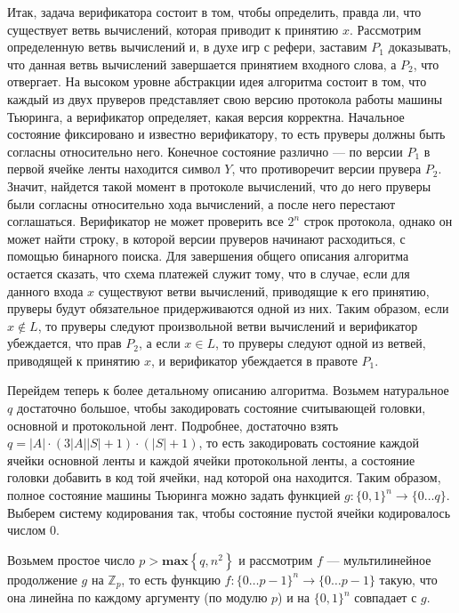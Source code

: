 \documentclass[14pt, a4paper]{extreport}
\newcommand{\set}[1]{\left\{#1\right\}}
\begin{document}
        Итак, задача верификатора состоит в том, чтобы определить, правда ли, что существует ветвь вычислений, которая приводит к принятию $x$. Рассмотрим определенную ветвь вычислений и, в духе игр с рефери, заставим $P_1$ доказывать, что данная ветвь вычислений завершается принятием входного слова, а $P_2$, что отвергает. На высоком уровне абстракции идея алгоритма состоит в том, что каждый из двух пруверов представляет свою версию протокола работы машины Тьюринга, а верификатор определяет, какая версия корректна. Начальное состояние фиксировано и известно верификатору, то есть пруверы должны быть согласны относительно него. Конечное состояние различно --- по версии $P_1$ в первой ячейке ленты находится символ $Y$, что противоречит версии прувера $P_2$. Значит, найдется такой момент в протоколе вычислений, что до него пруверы были согласны относительно хода вычислений, а после него перестают соглашаться.
        Верификатор не может проверить все $2^n$ строк протокола, однако он может найти строку, в которой версии пруверов начинают расходиться, с помощью бинарного поиска. Для завершения общего описания алгоритма остается сказать, что схема платежей служит тому, что в случае, если для данного входа $x$ существуют ветви вычислений, приводящие к его принятию, пруверы будут обязательное придерживаются одной из них. Таким образом, если $x \notin L$, то пруверы следуют произвольной ветви вычислений и верификатор убеждается, что прав $P_2$, а если $x \in L$, то пруверы следуют одной из ветвей, приводящей к принятию $x$, и верификатор убеждается в правоте $P_1$.

        Перейдем теперь к более детальному описанию алгоритма. Возьмем натуральное $q$ достаточно большое, чтобы закодировать состояние считывающей головки, основной и протокольной лент. Подробнее, достаточно взять $q = |A| \cdot (3|A||S| + 1) \cdot (|S| + 1)$, то есть закодировать состояние каждой ячейки основной ленты и каждой ячейки протокольной ленты, а состояние головки добавить в код той ячейки, над которой она находится. Таким образом, полное состояние машины Тьюринга можно задать функцией $g: \{0, 1\}^n \longrightarrow \{0\ldots q\}$. Выберем систему кодирования так, чтобы состояние пустой ячейки кодировалось числом 0.

        Возьмем простое число $p > \textbf{max}\set{q, n^2}$ и рассмотрим $f$ --- мультилинейное продолжение $g$ на $\mathbb{Z}_p$, то есть функцию $f: \{0\ldots p-1\}^n \longrightarrow \{0 \ldots p-1\}$ такую, что она линейна по каждому аргументу (по модулю $p$) и на $\{0, 1\}^n$ совпадает с $g$.
\end{document}
